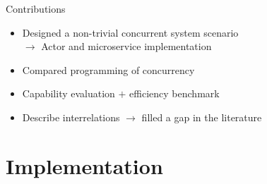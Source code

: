\documentclass{beamer}
\begin{document}

\begin{frame}{Contributions}

\begin{itemize}
  \item Designed a non-trivial concurrent system scenario \\%
        $\rightarrow$ Actor and microservice implementation
  \item Compared programming of concurrency
  \item Capability evaluation $+$ efficiency benchmark
  \item Describe interrelations $\rightarrow$ filled a gap in the literature
\end{itemize}

\end{frame}


\section{Implementation}

\end{document}
